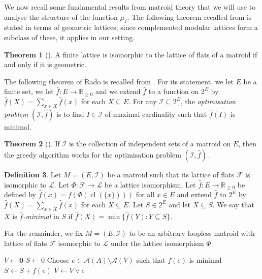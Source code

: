 \documentclass[a4paper,11pt,reqno]{article}
\theoremstyle{definition}
\newtheorem{theorem}{Theorem}[section]
\newtheorem{definition}[theorem]{{{Definition}}}
\newcommand{\mL}{\mathcal{L}}
\newcommand{\mA}{\mathcal{A}}
\newcommand{\RR}{\mathbb{R}}
\newcommand{\zero}{{\mathbf{0}}}
\DeclareMathOperator{\cl}{cl}
\begin{document}
We now recall some fundamental results from matroid theory that we will use to analyse the structure of the function $\mu_f$. The following theorem recalled from \cite{welsh} is stated in terms of geometric lattices; since complemented modular lattices form a subclass of these, it applies in our setting.
\begin{theorem}[{\cite[Chapter 3.3 Theorem 1]{welsh}}]\label{thm:mat_flat_lattice}
    A finite lattice is isomorphic to the lattice of flats of a matroid if and only if it is geometric.
\end{theorem}
The following theorem of Rado is recalled from \cite{welsh}. For its statement, we let $E$ be a finite set, we let $\hat{f}:E\to\mathbb{R}_{\geq0}$ and we extend $\hat{f}$ to a function on $2^E$ by $\hat{f}(X)=\sum_{x\in X}\hat{f}(x)$ for each $X\subseteq E$. For any $\mathcal{I}\subseteq 2^E$, the \emph{optimisation problem} $(\mathcal{I},\hat{f})$ is to find $I \in \mathcal{I}$ of maximal cardinality such that 
$\hat{f}(I)$ is minimal. 
\begin{theorem}[{\cite[Chapter 19.1 Theorem 1]{welsh}}]\label{thm:mat_greedy}
    If $\mathcal{I}$ is the collection of independent sets of a matroid on $E$, then the greedy algorithm works for the optimisation problem $(\mathcal{I},\hat{f})$.
\end{theorem}
\begin{definition}
    Let $M=(E,\mathcal{I})$ be a matroid such that its lattice of flats $\mathcal{F}$ is isomorphic to $\mathcal{L}$. Let $\Phi:\mathcal{F}\to\mathcal{L}$ be a lattice isomorphism. Let $\hat{f}:E\to\mathbb{R}_{\geq0}$ be defined by $\hat{f}(x)=f(\Phi(\cl(\{x\})))$ for all $x \in E$ and extend $\hat{f}$ to $2^E$ by $\hat{f}(X)=\sum_{x\in X}\hat{f}(x)$ for each $X\subseteq E$.
    Let $S \in 2^E$ and let $X \subseteq S$. 
    We say that $X$ is $\hat{f}$\emph{-minimal} in $S$ if
    $\hat{f}(X) = \min\{\hat{f}(Y) : Y \subseteq S\}$.
\end{definition}
For the remainder, we fix $M=(E,\mathcal{I})$ to be an arbitrary loopless matroid with lattice of flats $\mathcal{F}$ isomorphic to $\mL$ under the lattice isomorphism $\Phi$.

\begin{algorithm}
\caption{Greedy algorithm on the atoms of $A$ for any $f:\mA(\mL) \to \RR_{\geq 0}$ and $A \in \mL$}\label{alg:mu}
\begin{algorithmic}
\State $V \gets \zero$
\State $S \gets 0$
\While{$\mA(A) \setminus \mA(V) \neq \varnothing$}
    \State Choose $e \in \mA(A) \setminus \mA(V)$ such that $f(e)$ is minimal
    \State $S \gets S + f(e)$
    \State $V \gets V \vee e$
\EndWhile
\end{algorithmic}
\end{algorithm}
\end{document}
